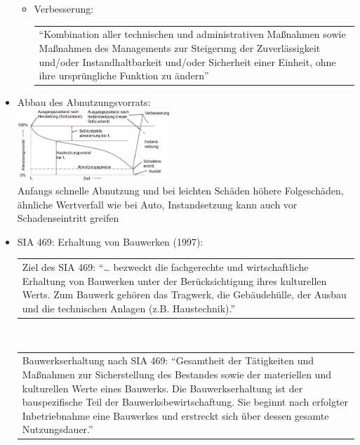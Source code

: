 \documentclass[fleqn,twoside,dvipsnames]{article}
\begin{document}
\begin{itemize}
\begin{itemize}
                    \item Verbesserung:\\
                        \begin{tabular}{|p{13cm}} \enquote{Kombination aller technischen und administrativen Maßnahmen sowie Maßnahmen des Managements zur Steigerung der Zuverlässigkeit und/oder Instandhaltbarkeit und/oder Sicherheit einer Einheit, ohne ihre ursprüngliche Funktion zu ändern} \end{tabular}\vspace{1.5mm}
                \end{itemize}
            \item Abbau des Abnutzungsvorrats: \label{BiB-Abnutzungsvorrat}\\
                    \includegraphics[width=0.45\textwidth]{Grafiken/Instandhaltung/Abbau des Abnutzungsvorrats.png}\\
                    Anfangs schnelle Abnutzung und bei leichten Schäden höhere Folgeschäden, ähnliche Wertverfall wie bei Auto, Instandsetzung kann auch vor Schadenseintritt greifen
            \item SIA 469: Erhaltung von Bauwerken (1997):\\
                \begin{tabular}{|p{13cm}} Ziel des SIA 469: \enquote{… bezweckt die fachgerechte und wirtschaftliche Erhaltung von Bauwerken unter der Berücksichtigung ihres kulturellen Werts. Zum Bauwerk gehören das Tragwerk, die Gebäudehülle, der Ausbau und die technischen Anlagen (z.B. Haustechnik).} \end{tabular}\vspace{1.5mm}\\
                \begin{tabular}{|p{13cm}} Bauwerkserhaltung nach SIA 469: \enquote{Gesamtheit der Tätigkeiten und Maßnahmen zur Sicherstellung des Bestandes sowie der materiellen und kulturellen Werte eines Bauwerks. Die Bauwerkserhaltung ist der bauspezifische Teil der Bauwerksbewirtschaftung. Sie beginnt nach erfolgter Inbetriebnahme eine Bauwerkes und erstreckt sich über dessen gesamte Nutzungsdauer.} \end{tabular}\vspace{1.5mm}\\

\end{itemize}
\end{document}
